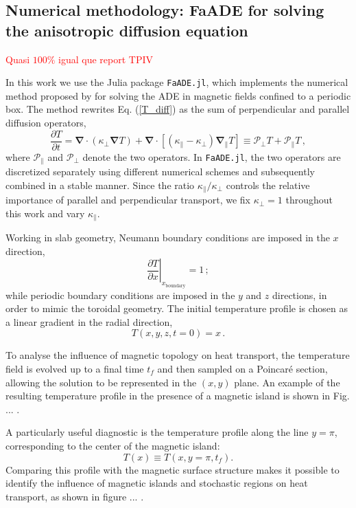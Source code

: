 \subsection{Numerical methodology: FaADE for solving the anisotropic diffusion equation}
\textcolor{red}{Quasi $100\%$ igual que report TPIV}

In this work we use the Julia package \texttt{FaADE.jl}, which implements the numerical method proposed by \cite{Muir} for solving the ADE in magnetic fields confined to a periodic box. The method rewrites Eq. (\ref{T_diff}) as the sum of perpendicular and parallel diffusion operators,
\begin{equation}\label{T_diff_FaADE}
\frac{\partial T}{\partial t} = \boldsymbol{\nabla}\cdot(\kappa_\perp\boldsymbol{\nabla}T)+\boldsymbol{\nabla}\cdot\left[(\kappa_\parallel-\kappa_\perp)\boldsymbol{\nabla}_\parallel T\right]\equiv \mathcal{P}_\perp T + \mathcal{P}_\parallel T\,,
\end{equation}
where $\mathcal{P}_\parallel$ and $\mathcal{P}_\perp$ denote the two operators. In \texttt{FaADE.jl}, the two operators are discretized separately using different numerical schemes and subsequently combined in a stable manner. Since the ratio $\kappa_\parallel/\kappa_\perp$ controls the relative importance of parallel and perpendicular transport, we fix $\kappa_\perp=1$ throughout this work and vary $\kappa_\parallel$.

Working in slab geometry, Neumann boundary conditions are imposed in the $x$ direction,
\begin{equation}
    \left.\frac{\partial T}{\partial x}\right|_{x_\text{boundary}}=1\,;
\end{equation}
while periodic boundary conditions are imposed in the $y$ and $z$ directions, in order to mimic the toroidal geometry. The initial temperature profile is chosen as a linear gradient in the radial direction,
\begin{equation}\label{T_IC}
T(x,y,z,t=0)=x\,.
\end{equation}


To analyse the influence of magnetic topology on heat transport, the temperature field is evolved up to a final time $t_f$ and then sampled on a Poincaré section, allowing the solution to be represented in the $(x,y)$ plane. An example of the resulting temperature profile in the presence of a magnetic island is shown in Fig. ... .

A particularly useful diagnostic is the temperature profile along the line $y=\pi$, corresponding to the center of the magnetic island:
\[
T(x)\equiv T(x,y=\pi,t_f).
\]
Comparing this profile with the magnetic surface structure makes it possible to identify the influence of magnetic islands and stochastic regions on heat transport, as shown in figure ... .


